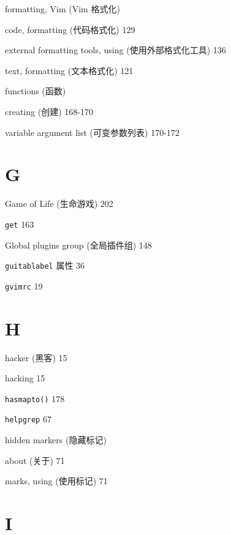 \begin{multicols}{2}
\hangindent=3pc  formatting, Vim (Vim 格式化) \par
\hangindent=3pc \quad code, formatting (代码格式化) 129 \par
\hangindent=3pc \quad external formatting tools, using (使用外部格式化工具) 136 \par
\hangindent=3pc \quad text, formatting (文本格式化) 121 \par

\hangindent=3pc  functions (函数) \par
\hangindent=3pc \quad creating (创建) 168-170 \par
\hangindent=3pc \quad variable argument list (可变参数列表) 170-172 \par

\hangindent=3pc  \section*{G}

\hangindent=3pc  Game of Life (生命游戏) 202

\hangindent=3pc  \texttt{get} 163

\hangindent=3pc  Global plugins group (全局插件组) 148

\hangindent=3pc  \texttt{guitablabel} 属性 36

\hangindent=3pc  \texttt{gvimrc} 19

\hangindent=3pc  \section*{H}

\hangindent=3pc  hacker (黑客) 15

\hangindent=3pc  hacking 15

\hangindent=3pc  \texttt{hasmapto()} 178

\hangindent=3pc  \texttt{helpgrep} 67

\hangindent=3pc  hidden markers (隐藏标记) \par
\hangindent=3pc \quad about (关于) 71 \par
\hangindent=3pc \quad marks, using (使用标记) 71 \par

\hangindent=3pc  \section*{I}


\end{multicols}
